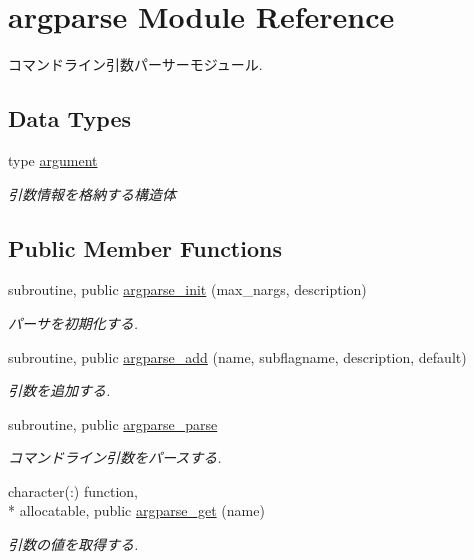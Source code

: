 \hypertarget{classargparse}{\section{argparse Module Reference}
\label{classargparse}
}


コマンドライン引数パーサーモジュール.  


\subsection*{Data Types}
\begin{DoxyCompactItemize}
\item 
type \hyperlink{structargparse_1_1argument}{argument}
\begin{DoxyCompactList}\small\item\em 引数情報を格納する構造体 \end{DoxyCompactList}\end{DoxyCompactItemize}
\subsection*{Public Member Functions}
\begin{DoxyCompactItemize}
\item 
subroutine, public \hyperlink{classargparse_aeb85887b563b50f8c05449d876ef63cc}{argparse\-\_\-init} (max\-\_\-nargs, description)
\begin{DoxyCompactList}\small\item\em パーサを初期化する. \end{DoxyCompactList}\item 
subroutine, public \hyperlink{classargparse_a7274c06b811b9e9172cbdfe8075cfd76}{argparse\-\_\-add} (name, subflagname, description, default)
\begin{DoxyCompactList}\small\item\em 引数を追加する. \end{DoxyCompactList}\item 
\hypertarget{classargparse_a25cb7f11c5526fa2822a7bd99e8a6b34}{subroutine, public \hyperlink{classargparse_a25cb7f11c5526fa2822a7bd99e8a6b34}{argparse\-\_\-parse}}\label{classargparse_a25cb7f11c5526fa2822a7bd99e8a6b34}

\begin{DoxyCompactList}\small\item\em コマンドライン引数をパースする. \end{DoxyCompactList}\item 
\hypertarget{classargparse_a8b42e64654862e7925fef38228a90e3d}{character(\-:) function, \\*
allocatable, public \hyperlink{classargparse_a8b42e64654862e7925fef38228a90e3d}{argparse\-\_\-get} (name)}\label{classargparse_a8b42e64654862e7925fef38228a90e3d}

\begin{DoxyCompactList}\small\item\em 引数の値を取得する. \end{DoxyCompactList}\end{DoxyCompactItemize}


